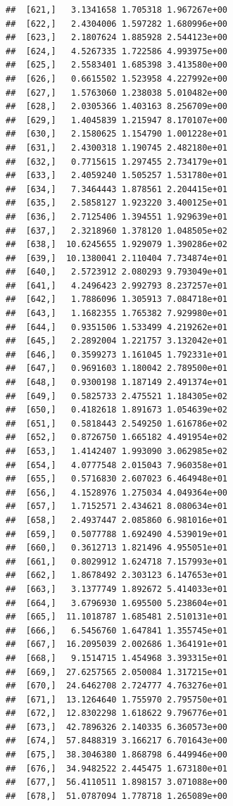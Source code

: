 \documentclass[article]{jss}\usepackage[]{graphicx}\usepackage[]{xcolor}
\makeatletter
\newenvironment{kframe}{%
 \def\at@end@of@kframe{}%
 \ifinner\ifhmode%
  \def\at@end@of@kframe{\end{minipage}}%
  \begin{minipage}{\columnwidth}%
 \fi\fi%
 \def\FrameCommand##1{\hskip\@totalleftmargin \hskip-\fboxsep
 \colorbox{shadecolor}{##1}\hskip-\fboxsep
     \hskip-\linewidth \hskip-\@totalleftmargin \hskip\columnwidth}%
 \MakeFramed {\advance\hsize-\width
   \@totalleftmargin\z@ \linewidth\hsize
   \@setminipage}}%
 {\par\unskip\endMakeFramed%
 \at@end@of@kframe}
\newenvironment{knitrout}{}{} %
\makeatother
\begin{document}
\begin{knitrout}
\begin{kframe}
\begin{verbatim}
##  [621,]   3.1341658 1.705318 1.967267e+00
##  [622,]   2.4304006 1.597282 1.680996e+00
##  [623,]   2.1807624 1.885928 2.544123e+00
##  [624,]   4.5267335 1.722586 4.993975e+00
##  [625,]   2.5583401 1.685398 3.413580e+00
##  [626,]   0.6615502 1.523958 4.227992e+00
##  [627,]   1.5763060 1.238038 5.010482e+00
##  [628,]   2.0305366 1.403163 8.256709e+00
##  [629,]   1.4045839 1.215947 8.170107e+00
##  [630,]   2.1580625 1.154790 1.001228e+01
##  [631,]   2.4300318 1.190745 2.482180e+01
##  [632,]   0.7715615 1.297455 2.734179e+01
##  [633,]   2.4059240 1.505257 1.531780e+01
##  [634,]   7.3464443 1.878561 2.204415e+01
##  [635,]   2.5858127 1.923220 3.400125e+01
##  [636,]   2.7125406 1.394551 1.929639e+01
##  [637,]   2.3218960 1.378120 1.048505e+02
##  [638,]  10.6245655 1.929079 1.390286e+02
##  [639,]  10.1380041 2.110404 7.734874e+01
##  [640,]   2.5723912 2.080293 9.793049e+01
##  [641,]   4.2496423 2.992793 8.237257e+01
##  [642,]   1.7886096 1.305913 7.084718e+01
##  [643,]   1.1682355 1.765382 7.929980e+01
##  [644,]   0.9351506 1.533499 4.219262e+01
##  [645,]   2.2892004 1.221757 3.132042e+01
##  [646,]   0.3599273 1.161045 1.792331e+01
##  [647,]   0.9691603 1.180042 2.789500e+01
##  [648,]   0.9300198 1.187149 2.491374e+01
##  [649,]   0.5825733 2.475521 1.184305e+02
##  [650,]   0.4182618 1.891673 1.054639e+02
##  [651,]   0.5818443 2.549250 1.616786e+02
##  [652,]   0.8726750 1.665182 4.491954e+02
##  [653,]   1.4142407 1.993090 3.062985e+02
##  [654,]   4.0777548 2.015043 7.960358e+01
##  [655,]   0.5716830 2.607023 6.464948e+01
##  [656,]   4.1528976 1.275034 4.049364e+00
##  [657,]   1.7152571 2.434621 8.080634e+01
##  [658,]   2.4937447 2.085860 6.981016e+01
##  [659,]   0.5077788 1.692490 4.539019e+01
##  [660,]   0.3612713 1.821496 4.955051e+01
##  [661,]   0.8029912 1.624718 7.157993e+01
##  [662,]   1.8678492 2.303123 6.147653e+01
##  [663,]   3.1377749 1.892672 5.414033e+01
##  [664,]   3.6796930 1.695500 5.238604e+01
##  [665,]  11.1018787 1.685481 2.510131e+01
##  [666,]   6.5456760 1.647841 1.355745e+01
##  [667,]  16.2095039 2.002686 1.364191e+01
##  [668,]   9.1514715 1.454968 3.393315e+01
##  [669,]  27.6257565 2.050084 1.317215e+01
##  [670,]  24.6462708 2.724777 4.763276e+01
##  [671,]  13.1264640 1.755970 2.795750e+01
##  [672,]  12.8302298 1.618622 9.796776e+01
##  [673,]  42.7896326 2.140335 6.360573e+00
##  [674,]  57.8488319 3.166217 6.701643e+00
##  [675,]  38.3046380 1.868798 6.449946e+00
##  [676,]  34.9482522 2.445475 1.673180e+01
##  [677,]  56.4110511 1.898157 3.071088e+00
##  [678,]  51.0787094 1.778718 1.265089e+00

\end{verbatim}
\end{kframe}
\end{knitrout}
\end{document}
